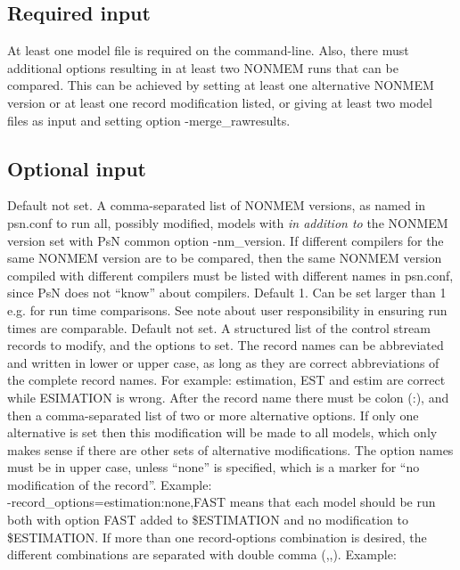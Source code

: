 \subsection{Required input}
At least one model file is required on the command-line. 
Also, there must additional options resulting in at least two NONMEM runs that can be compared. This can be
achieved by setting at least one alternative NONMEM version or at least one record modification listed,
or giving at least two model files as input and setting option -merge\_rawresults. 

\subsection{Optional input}

\begin{optionlist}
Default not set. 
A comma-separated list of NONMEM versions, as named in psn.conf to run all, possibly modified, models with
\emph{in addition to} the NONMEM version set with PsN common option -nm\_version.
If different compilers for the same NONMEM version are to be compared, 
then the same NONMEM version compiled with different compilers
must be listed with different names in psn.conf, since PsN does not ``know'' about compilers.
\nextopt
{}
Default 1. Can be set larger than 1 e.g. for run time comparisons.
See note about user responsibility in ensuring run times are comparable.
\nextopt
{}
Default not set.
A structured list of the control stream records to modify, and the options to set. 
The record names can be abbreviated and written in lower or upper case,
as long as they are correct abbreviations of the complete record names. 
For example: estimation, EST and estim are correct while ESIMATION
is wrong. After the record name there must be colon (:), and then
a comma-separated list of two or more alternative options.
If only one alternative is set then this modification will be made to all models, which only makes
sense if there are other sets of alternative modifications.
The option names must be in upper case, unless ``none'' is specified, which is 
a marker for ``no modification of the record''. Example: \\
-record\_options=estimation:none,FAST means that
each model should be run both with option FAST added to \$ESTIMATION and no modification to \$ESTIMATION.
If more than one record-options combination is desired, the different combinations are 
separated with double comma (,,). Example: \\

\end{optionlist}
